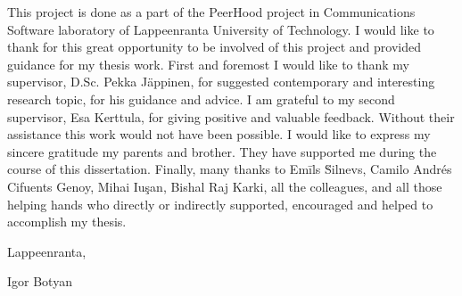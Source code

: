 \vspace*{10em}
\newpage
{}
This project is done as a part of the PeerHood project in Communications Software laboratory of
Lappeenranta University of Technology. I would like to thank for this great opportunity to be
involved of this project and provided guidance for my thesis work.
First and foremost I would like to thank my supervisor, D.Sc. Pekka J\"appinen, for suggested
contemporary and interesting research topic, for his guidance and advice. I am grateful to my second
supervisor, Esa Kerttula, for giving positive and valuable feedback. Without their assistance this
work would not have been possible.
I would like to express my sincere gratitude my parents and brother. They have supported me during
the course of this dissertation.
Finally, many thanks to Em\={i}ls \u{S}i\cb l\cb nevs, Camilo Andr\'{e}s
Cifuents Genoy, Mihai Iu\c{s}an, Bishal Raj Karki, all the colleagues, and all those helping hands
who directly or indirectly supported, encouraged and helped to accomplish my thesis.
\vspace*{3em}
\par Lappeenranta,\ \thesisdate
\vspace*{3em}
\par Igor Botyan
%
